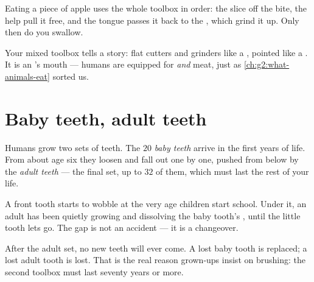 \begin{example}\label{ex:g2:teeth-and-eating-well:apple}
Eating a piece of apple uses the whole toolbox in order: the
 slice off the bite, the  help pull it free, and
the tongue passes it back to the , which grind it up. Only
then do you swallow.
\end{example}

\begin{remark}\label{rem:g2:teeth-and-eating-well:animals}
Your mixed toolbox tells a story: flat cutters and grinders like a
, pointed  like a . It is an 's
mouth --- humans are equipped for  \emph{and} meat, just as
\cref{ch:g2:what-animals-eat} sorted us.
\end{remark}

\section{Baby teeth, adult teeth}

\begin{proposition}\label{prop:g2:teeth-and-eating-well:sets}
Humans grow two sets of teeth. The $20$ \emph{baby
teeth} arrive in the first years of life. From
about age six they loosen and fall out one by one, pushed from
below by the \emph{adult teeth} --- the final
set, up to $32$ of them, which must last the rest of your life.
\end{proposition}
\admitted

\begin{example}\label{ex:g2:teeth-and-eating-well:wobbly}
A front tooth starts to wobble at the very age children start
school. Under it, an adult  has been quietly growing and
dissolving the baby tooth's , until the little tooth lets go.
The gap is not an accident --- it is a changeover.
\end{example}

\begin{remark}\label{rem:g2:teeth-and-eating-well:nothird}
After the adult set, no new teeth will ever come. A lost baby
tooth is replaced; a lost adult tooth is lost. That is the real
reason grown-ups insist on brushing: the second toolbox must last
seventy years or more.
\end{remark}

